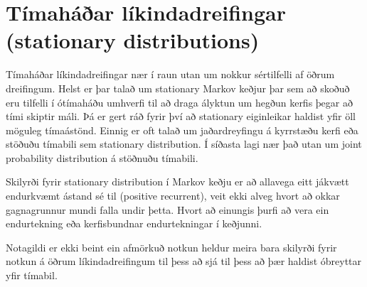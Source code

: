 \section {Tímaháðar líkindadreifingar (stationary distributions)}


Tímaháðar líkindadreifingar nær í raun utan um nokkur sértilfelli af öðrum dreifingum. Helst er þar talað um stationary Markov keðjur þar sem að skoðuð eru tilfelli í ótímaháðu umhverfi til að draga ályktun um hegðun kerfis þegar að tími skiptir máli. Þá er gert ráð fyrir því að stationary eiginleikar haldist yfir öll möguleg tímaástönd. Einnig er oft talað um jaðardreyfingu á kyrrstæðu kerfi eða stöðuðu tímabili sem stationary distribution. Í síðasta lagi nær það utan um joint probability distribution á stöðnuðu tímabili.

Skilyrði fyrir stationary distribution í Markov keðju er að allavega eitt jákvætt endurkvæmt ástand sé til (positive recurrent), veit ekki alveg hvort að okkar gagnagrunnur mundi falla undir þetta. Hvort að einungis þurfi að vera ein endurtekning eða kerfisbundnar endurtekningar í keðjunni.

Notagildi er ekki beint ein afmörkuð notkun heldur meira bara skilyrði fyrir notkun á öðrum líkindadreifingum til þess að sjá til þess að þær haldist óbreyttar yfir tímabil.
